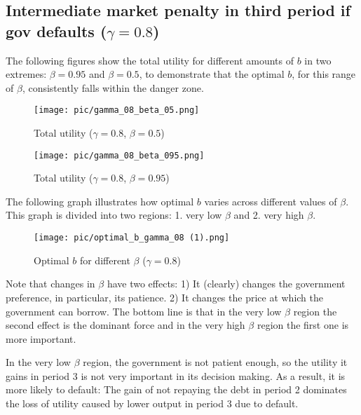 \documentclass{article}
\begin{document}
\subsection{Intermediate market penalty in third period if gov defaults ($\gamma = 0.8$)}


The following figures show the total utility for different amounts of $b$ in two extremes: $\beta = 0.95$ and $\beta = 0.5$, to demonstrate that the optimal $b$, for this range of $\beta$, consistently falls within the danger zone.


\begin{figure}[H]
    \centering
    \begin{minipage}{0.5\textwidth}
        \centering
        \texttt{[image: pic/gamma\_08\_beta\_05.png]}
        \caption{Total utility ($\gamma = 0.8$, $\beta = 0.5$)}
        \label{fig:gamma05beta05}
    \end{minipage}\hfill
    \begin{minipage}{0.5\textwidth}
        \centering
        \texttt{[image: pic/gamma\_08\_beta\_095.png]}
        \caption{Total utility ($\gamma = 0.8$, $\beta = 0.95$)}
        \label{fig:gamma05beta095}
    \end{minipage}
\end{figure}


The following graph illustrates how optimal $b$ varies across different values of $\beta$. This graph is divided into two regions: 1. very low $\beta$ and 2. very high $\beta$. 

\begin{figure}[H]
\centering
{\texttt{[image: pic/optimal\_b\_gamma\_08 (1).png]}}
\caption{Optimal $b$ for different $\beta$ ($\gamma = 0.8$)}
\label{fig:Simulation11}
\end{figure}

Note that changes in $\beta$ have two effects: 1) It (clearly) changes the government preference, in particular, its patience. 2) It changes the price at which the government can borrow. The bottom line is that in the very low $\beta$ region the second effect is the dominant force and in the very high $\beta$ region the first one is more important.

In the very low $\beta$ region, the government is not patient enough, so the utility it gains in period 3 is not very important in its decision making. As a result, it is more likely to default: The gain of not repaying the debt in period 2 dominates the loss of utility caused by lower output in period 3 due to default. 
\end{document}
